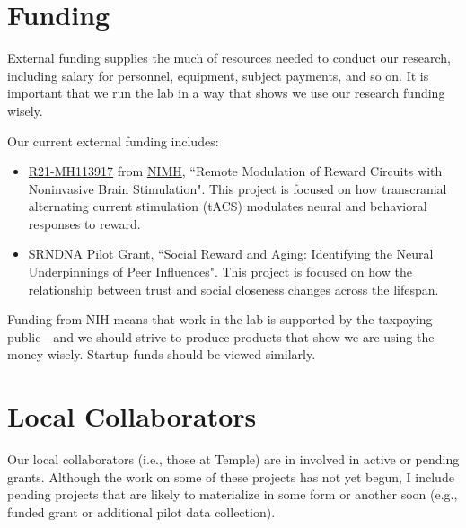 \documentclass[letterpaper,12pt,oneside]{memoir}
\begin{document}
\section{Funding}

External funding supplies the much of resources needed to conduct our research, including salary for personnel, equipment, subject payments, and so on. It is important that we run the lab in a way that shows we use our research funding wisely. 

Our current external funding includes:

\begin{itemize}

\item \href{https://projectreporter.nih.gov/Reporter_Viewsh.cfm?sl=12EECD0C478DC1D27598B8961CAA4A01A2FFCEB861BF}{R21-MH113917} from \href{https://www.nimh.nih.gov/index.shtml}{NIMH}, ``Remote Modulation of Reward Circuits with Noninvasive Brain Stimulation". This project is focused on how transcranial alternating current stimulation (tACS) modulates neural and behavioral responses to reward. 

\item \href{https://www.decisionneuroaging.network/funding/}{SRNDNA Pilot Grant}, ``Social Reward and Aging: Identifying the Neural Underpinnings of Peer Influences". This project is focused on how the relationship between trust and social closeness changes across the lifespan. 

\end{itemize}

Funding from NIH means that work in the lab is supported by the taxpaying public---and we should strive to produce products that show we are using the money wisely. Startup funds should be viewed similarly. 

\section{Local Collaborators}
Our local collaborators (i.e., those at Temple) are in involved in active or pending grants. Although the work on some of these projects has not yet begun, I include pending projects that are likely to materialize in some form or another soon (e.g., funded grant or additional pilot data collection).
\end{document}
